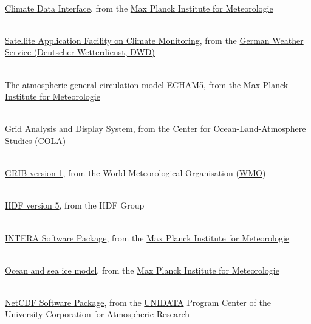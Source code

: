 \begin{thebibliography}{xx}


 \ \\
  \href{http://www.mpimet.mpg.de/cdi}
       {Climate Data Interface},
  from the
  \href{http://www.mpimet.mpg.de}
       {Max Planck Institute for Meteorologie}


 \ \\
  \href{http://www.cmsaf.dwd.de}
       {Satellite Application Facility on Climate Monitoring},
  from the
  \href{http://www.dwd.de}
       {German Weather Service (Deutscher Wetterdienst, DWD)}


 \ \\
  \href{http://www.mpimet.mpg.de/wissenschaft/publikationen/reports.html}
       {The atmospheric general circulation model ECHAM5},
  from the
  \href{http://www.mpimet.mpg.de}
       {Max Planck Institute for Meteorologie}


 \ \\
  \href{http://www.iges.org/grads/}
       {Grid Analysis and Display System},
  from the Center for Ocean-Land-Atmosphere Studies
  (\href{http://www.iges.org/cola.html}{COLA})


 \ \\
  \href{http://www.wmo.ch/web/www/WMOCodes/Guides/GRIB/GRIB1-Contents.html}
       {GRIB version 1},
  from the World Meteorological Organisation
  (\href{http://www.wmo.ch}{WMO})


 \ \\
  \href{http://hdf.ncsa.uiuc.edu/HDF5/}
       {HDF version 5},
  from the HDF Group


 \ \\
  \href{http://wekuw.met.fu-berlin.de/~IngoKirchner/nudging/nudging}{INTERA Software Package},
  from the
  \href{http://www.mpimet.mpg.de}
       {Max Planck Institute for Meteorologie}


 \ \\
  \href{http://www.mpimet.mpg.de/en/wissenschaft/modelle/mpiom/mpiom-description.html}
       {Ocean and sea ice model},
  from the
  \href{http://www.mpimet.mpg.de}
       {Max Planck Institute for Meteorologie}


 \ \\
  \href{http://www.unidata.ucar.edu/packages/netcdf}{NetCDF Software Package},
  from the
  \href{http://www.unidata.ucar.edu}{UNIDATA}
  Program Center of the University Corporation for Atmospheric Research



\end{thebibliography}
